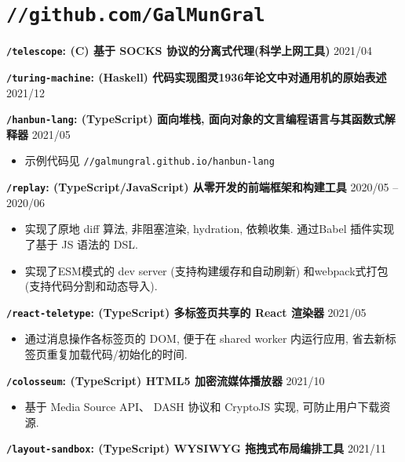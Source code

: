 \documentclass[10pt]{article}
\begin{document}
\section*{\texttt{\large //github.com/GalMunGral}}

\textbf{\texttt{/telescope}:  (C) 基于 SOCKS 协议的分离式代理(科学上网工具)}   \hfill 2021/04

\vspace{0.5em}
\textbf{\texttt{/turing-machine}:  (Haskell) 代码实现图灵1936年论文中对通用机的原始表述} \hfill 2021/12

\vspace{0.5em}
\textbf{\texttt{/hanbun-lang}: (TypeScript) 面向堆栈, 面向对象的文言编程语言与其函数式解释器} \hfill 2021/05
\begin{itemize}
\item 示例代码见 \texttt{//galmungral.github.io/hanbun-lang}
\end{itemize}

\vspace{0.5em}
\textbf{\texttt{/replay}: (TypeScript/JavaScript)  从零开发的前端框架和构建工具 } \hfill 2020/05 -- 2020/06
\begin{itemize}
\item 实现了原地 diff 算法, 非阻塞渲染, hydration, 依赖收集. 通过Babel 插件实现了基于 JS 语法的 DSL.
\item 实现了ESM模式的 dev server (支持构建缓存和自动刷新) 和webpack式打包 (支持代码分割和动态导入).
\end{itemize}

\vspace{0.5em}
\textbf{\texttt{/react-teletype}:  (TypeScript) 多标签页共享的 React 渲染器} \hfill 2021/05 
\begin{itemize}
\item  通过消息操作各标签页的 DOM, 便于在 shared worker 内运行应用, 省去新标签页重复加载代码/初始化的时间.
\end{itemize}

\vspace{0.5em}
\textbf{\texttt{/colosseum}:  (TypeScript) HTML5 加密流媒体播放器}   \hfill 2021/10
\begin{itemize}
\item 基于 Media Source API、 DASH 协议和 CryptoJS 实现, 可防止用户下载资源.
\end{itemize}

\vspace{0.5em}
\textbf{\texttt{/layout-sandbox}: (TypeScript) WYSIWYG 拖拽式布局编排工具} \hfill 2021/11
\end{document}
